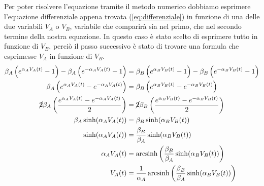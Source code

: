 		Per poter risolvere l'equazione tramite il metodo numerico dobbiamo esprimere l'equazione differenziale appena trovata (\ref{eq:differenziale}) in funzione di una delle due variabili $V_{A}$ o $V_{B}$, variabile che comparirà sia nel primo, che nel secondo termine della nostra equazione. In questo caso è stato scelto di esprimere tutto in funzione di $V_{B}$, perciò il passo successivo è stato di trovare una formula che esprimesse $V_{A}$ in funzione di $V_{B}$.
		\begin{equation}
			\label{eq:tensione_A_B}
			\begin{split}
				\beta_{A}\left(e^{\alpha_{A}V_{A}(t)}-1\right)-\beta_{A}\left(e^{-\alpha_{A}V_{A}(t)}-1\right) &= \beta_{B}\left(e^{\alpha_{B}V_{B}(t)}-1\right)-\beta_{B}\left(e^{-\alpha_{B}V_{B}(t)}-1\right)\\
				\beta_{A}\left(e^{\alpha_{A}V_{A}(t)}-e^{-\alpha_{A}V_{A}(t)}\right) &= \beta_{B}\left(e^{\alpha_{B}V_{B}(t)}-e^{-\alpha_{B}V_{B}(t)}\right)\\
				\cancel{2}\beta_{A}\left(\frac{e^{\alpha_{A}V_{A}(t)}-e^{-\alpha_{A}V_{A}(t)}}{2}\right) &= \cancel{2}\beta_{B}\left(\frac{e^{\alpha_{B}V_{B}(t)}-e^{-\alpha_{B}V_{B}(t)}}{2}\right)\\
				\beta_{A} \sinh(\alpha_{A}V_{A}(t)) &= \beta_{B} \sinh(\alpha_{B}V_{B}(t))\\
				\sinh(\alpha_{A}V_{A}(t)) &= \frac{\beta_{B}}{\beta_{A}} \sinh(\alpha_{B}V_{B}(t))\\
				\alpha_{A}V_{A}(t) &= \operatorname{arcsinh} \left(\frac{\beta_{B}}{\beta_{A}} \sinh(\alpha_{B}V_{B}(t))\right)\\
				V_{A}(t) &= \frac{1}{\alpha_{A}} \operatorname{arcsinh} \left(\frac{\beta_{B}}{\beta_{A}} \sinh(\alpha_{B}V_{B}(t))\right)
			\end{split}
		\end{equation}
		\pagebreak
		
